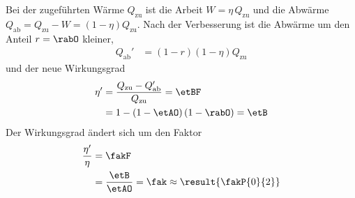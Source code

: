Bei der zugeführten Wärme $Q_\text{zu}$ ist die Arbeit $W = \eta\,Q_\text{zu}$ und die Abwärme $Q_\text{ab} = Q_\text{zu}-W = \left(1-\eta\right)Q_\text{zu}$. Nach der Verbesserung ist die Abwärme um den Anteil $r = \rabO$ kleiner,
\begin{align}
 Q_\text{ab}' &= \left(1-r\right)\left(1-\eta\right)Q_\text{zu}
\end{align}
und der neue Wirkungsgrad
\begin{align}
 \eta' &= \frac{Q_\text{zu}-Q_\text{ab}'}{Q_\text{zu}} = \etBF \\
   &= 1-\left(1-\etAO\right)\left(1-\rabO\right) = \etB
\end{align}
Der Wirkungsgrad ändert sich um den Faktor
\begin{align}
 \frac{\eta'}{\eta} &= \fakF \\
   &= \frac{\etB}{\etAO} = \fak \approx \result{\fakP{0}{2}}
\end{align}
